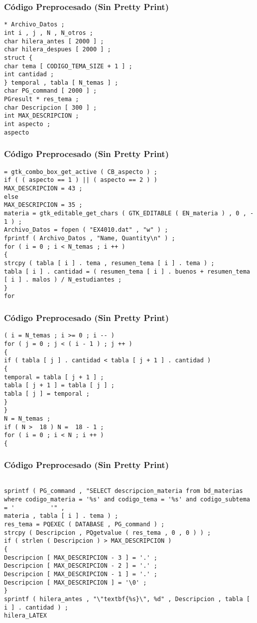 \documentclass{beamer}
\begin{document}
\begin{frame}[fragile]
\frametitle{C\'odigo Preprocesado (Sin Pretty Print)}
\begin{lstlisting}[style=CStyle]
* Archivo_Datos ; 
int i , j , N , N_otros ; 
char hilera_antes [ 2000 ] ; 
char hilera_despues [ 2000 ] ; 
struct { 
char tema [ CODIGO_TEMA_SIZE + 1 ] ; 
int cantidad ; 
} temporal , tabla [ N_temas ] ; 
char PG_command [ 2000 ] ; 
PGresult * res_tema ; 
char Descripcion [ 300 ] ; 
int MAX_DESCRIPCION ; 
int aspecto ; 
aspecto \end{lstlisting}
\end{frame}
\begin{frame}[fragile]
\frametitle{C\'odigo Preprocesado (Sin Pretty Print)}
\begin{lstlisting}[style=CStyle]
= gtk_combo_box_get_active ( CB_aspecto ) ; 
if ( ( aspecto == 1 ) || ( aspecto == 2 ) ) 
MAX_DESCRIPCION = 43 ; 
else 
MAX_DESCRIPCION = 35 ; 
materia = gtk_editable_get_chars ( GTK_EDITABLE ( EN_materia ) , 0 , - 1 ) ; 
Archivo_Datos = fopen ( "EX4010.dat" , "w" ) ; 
fprintf ( Archivo_Datos , "Name, Quantity\n" ) ; 
for ( i = 0 ; i < N_temas ; i ++ ) 
{ 
strcpy ( tabla [ i ] . tema , resumen_tema [ i ] . tema ) ; 
tabla [ i ] . cantidad = ( resumen_tema [ i ] . buenos + resumen_tema [ i ] . malos ) / N_estudiantes ; 
} 
for \end{lstlisting}
\end{frame}
\begin{frame}[fragile]
\frametitle{C\'odigo Preprocesado (Sin Pretty Print)}
\begin{lstlisting}[style=CStyle]
( i = N_temas ; i >= 0 ; i -- ) 
for ( j = 0 ; j < ( i - 1 ) ; j ++ ) 
{ 
if ( tabla [ j ] . cantidad < tabla [ j + 1 ] . cantidad ) 
{ 
temporal = tabla [ j + 1 ] ; 
tabla [ j + 1 ] = tabla [ j ] ; 
tabla [ j ] = temporal ; 
} 
} 
N = N_temas ; 
if ( N >  18 ) N =  18 - 1 ; 
for ( i = 0 ; i < N ; i ++ ) 
{ \end{lstlisting}
\end{frame}
\begin{frame}[fragile]
\frametitle{C\'odigo Preprocesado (Sin Pretty Print)}
\begin{lstlisting}[style=CStyle]

sprintf ( PG_command , "SELECT descripcion_materia from bd_materias where codigo_materia = '%s' and codigo_tema = '%s' and codigo_subtema = '          '" , 
materia , tabla [ i ] . tema ) ; 
res_tema = PQEXEC ( DATABASE , PG_command ) ; 
strcpy ( Descripcion , PQgetvalue ( res_tema , 0 , 0 ) ) ; 
if ( strlen ( Descripcion ) > MAX_DESCRIPCION ) 
{ 
Descripcion [ MAX_DESCRIPCION - 3 ] = '.' ; 
Descripcion [ MAX_DESCRIPCION - 2 ] = '.' ; 
Descripcion [ MAX_DESCRIPCION - 1 ] = '.' ; 
Descripcion [ MAX_DESCRIPCION ] = '\0' ; 
} 
sprintf ( hilera_antes , "\"textbf{%s}\", %d" , Descripcion , tabla [ i ] . cantidad ) ; 
hilera_LATEX \end{lstlisting}
\end{frame}
\end{document}
